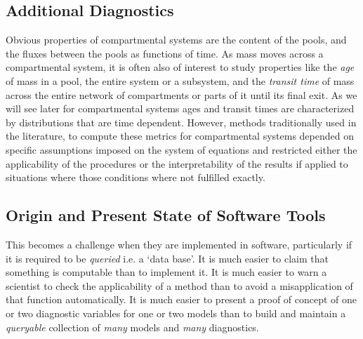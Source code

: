 \subsection{Additional Diagnostics} 
Obvious properties of compartmental systems are the content of the pools,
and the fluxes between the pools as functions of time.
As mass moves across a compartmental system, it is often also of interest to study
properties like the \emph{age} of mass in a pool, the entire system
or a subsystem, and the \emph{transit time} of mass 
across the entire network of compartments or parts of it until its
final exit. 
As we will see later for compartmental systems ages and transit times are characterized by
distributions that are time dependent. 
However, methods traditionally used in the literature, to compute these metrics for
compartmental systems depended on specific assumptions imposed on the system
of equations \citep{Sierra2017GCB} and restricted either the applicability 
of the procedures or the interpretability of the results if applied to situations 
where those conditions where not fulfilled exactly. 

\subsection{Origin and Present State of Software Tools}
This becomes a challenge when they are implemented in software, 
particularly if it is required to be \emph{queried} i.e. a `data base'.
It is much easier to claim that something is computable than to implement it.
It is much easier to warn a scientist to check the applicability of a method than to avoid
a misapplication of that function automatically.
It is much easier to present a proof of concept of one or two diagnostic
variables for one or two models than to build and maintain a \emph{queryable} collection of
\emph{many} models and \emph{many} diagnostics.

